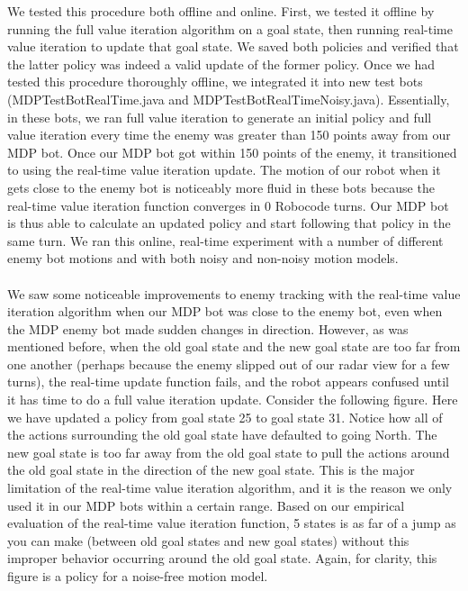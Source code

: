 \documentclass{aiaa-tc}%
\begin{document}
We tested this procedure both offline and online. First, we tested it offline by running the full value iteration algorithm on a goal state, then running real-time value iteration to update that goal state. We saved both policies and verified that the latter policy was indeed a valid update of the former policy. 
Once we had tested this procedure thoroughly offline, we integrated it into new test bots (MDPTestBotRealTime.java and MDPTestBotRealTimeNoisy.java). Essentially, in these bots, we ran full value iteration to generate an initial policy and full value iteration every time the enemy was greater than 150 points away from our MDP bot. Once our MDP bot got within 150 points of the enemy, it transitioned to using the real-time value iteration update. The motion of our robot when it gets close to the enemy bot is noticeably more fluid in these bots because the real-time value iteration function converges in 0 Robocode turns. Our MDP bot is thus able to calculate an updated policy and start following that policy in the same turn. We ran this online, real-time experiment with a number of different enemy bot motions and with both noisy and non-noisy motion models. \\ \\
We saw some noticeable improvements to enemy tracking with the real-time value iteration algorithm when our MDP bot was close to the enemy bot, even when the MDP enemy bot made sudden changes in direction. However, as was mentioned before, when the old goal state and the new goal state are too far from one another (perhaps because the enemy slipped out of our radar view for a few turns), the real-time update function fails, and the robot appears confused until it has time to do a full value iteration update. Consider the following figure. Here we have updated a policy from goal state 25 to goal state 31. Notice how all of the actions surrounding the old goal state have defaulted to going North. The new goal state is too far away from the old goal state to pull the actions around the old goal state in the direction of the new goal state. This is the major limitation of the real-time value iteration algorithm, and it is the reason we only used it in our MDP bots within a certain range. Based on our empirical evaluation of the real-time value iteration function, 5 states is as far of a jump as you can make (between old goal states and new goal states) without this improper behavior occurring around the old goal state. Again, for clarity, this figure is a policy for a noise-free motion model.  
\end{document}
